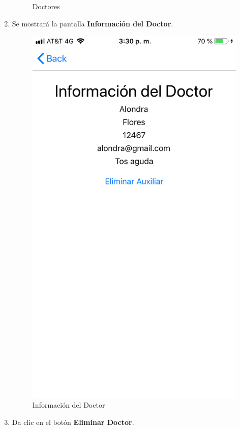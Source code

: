 \begin{enumerate}
\begin{figure}[!htbp]
\begin{center}
			\caption{Doctores}
			\label{fig:Doctores2}
		\end{center}
	\end{figure}

	\item Se mostrará la pantalla \textbf{Información del Doctor}.
	\newpage
	\begin{figure}[!htbp]			
		\hypertarget{fig:InfoDoctor}{\hspace{1pt}}
		\begin{center}
			\includegraphics[height=0.4\textheight]{Paciente/EliminarDoctor/images/InfoDoctor}
			\caption{Información del Doctor}
			\label{fig:InfoDoctor}
		\end{center}
	\end{figure}

	\item Da clic en el botón \textbf{Eliminar Doctor}.
	
\end{enumerate}

